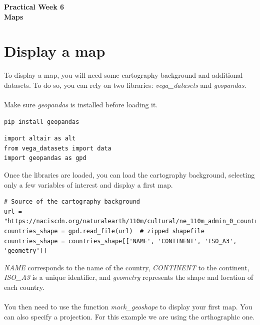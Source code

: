 \documentclass[11pt]{article}
\begin{document}
\pagestyle{fancy}
\renewcommand{\headrulewidth}{0pt}
\fancyfoot[L]{\thepage}
\fancyfoot[C]{}

\begin{center}
\vspace*{1cm}
{\textbf {\Huge Practical Week 6}}\\
\vspace*{0.5cm}
{\textbf {\huge Maps}}
\vspace*{1cm}
\end{center}


\section{Display a map}

To display a map, you will need some cartography background and additional datasets. To do so, you can rely on two libraries: \textit{vega\_datasets} and \textit{geopandas}.\\
\\
Make sure \textit{geopandas} is installed before loading it.

\begin{verbatim}
pip install geopandas
\end{verbatim}

\begin{verbatim}
import altair as alt
from vega_datasets import data
import geopandas as gpd
\end{verbatim}

Once the libraries are loaded, you can load the cartography background, selecting only a few variables of interest and display a first map.

\begin{verbatim}
# Source of the cartography background
url = "https://naciscdn.org/naturalearth/110m/cultural/ne_110m_admin_0_countries.zip"
countries_shape = gpd.read_file(url)  # zipped shapefile
countries_shape = countries_shape[['NAME', 'CONTINENT', 'ISO_A3', 'geometry']]
\end{verbatim}

\textit{NAME} corresponds to the name of the country, \textit{CONTINENT} to the continent, \textit{ISO\_A3} is a unique identifier, and \textit{geometry} represents the shape and location of each country.\\
\\
You then need to use the function \textit{mark\_geoshape} to display your first map. You can also specify a projection. For this example we are using the orthographic one.
\end{document}
